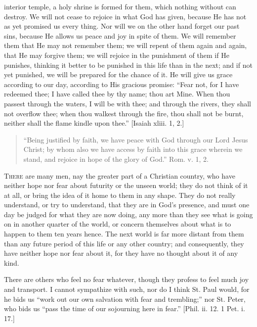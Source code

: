 interior temple, a holy shrine is formed for them, which nothing
without can destroy. We will not cease to rejoice in what God has
given, because He has not as yet promised us every thing. Nor will we
on the other hand forget our past sins, because He allows us peace and
joy in spite of them. We will remember them that He may not remember
them; we will repent of them again and again, that He may forgive
them; we will rejoice in the punishment of them if He punishes,
thinking it better to be punished in this life than in the next; and
if not yet punished, we will be prepared for the chance of it. He will
give us grace according to our day, according to His gracious promise:
``Fear not, for I have redeemed thee; I have called thee by thy
name; thou art Mine. When thou passest through the waters, I will be
with thee; and through the rivers, they shall not overflow thee; when
thou walkest through the fire, thou shall not be burnt, neither shall
the flame kindle upon thee.'' [Isaiah xliii. 1, 2.]


\begin{quote}

``Being justified by faith, we have peace with God through
our Lord Jesus Christ; by whom also we have access by faith into
this grace wherein we stand, and rejoice in hope of the glory of
God.'' Rom. v. 1, 2.

\end{quote}

T\textsc{here} are many men, nay the greater part of a Christian country,
who have neither hope nor fear about futurity or the unseen world;
they do not think of it at all, or bring the idea of it home to them
in any shape. They do not really understand, or try to understand,
that they are in God's presence, and must one day be judged for what
they are now doing, any more than they see what is going on in another
quarter of the world, or concern themselves about what is to happen to
them ten years hence. The next world is far more distant from them
than any future period of this life or any other country; and
consequently, they have neither hope nor fear about it, for they have
no thought about it of any kind.

There are others who feel no fear whatever, though they profess to
feel much joy and transport. I cannot sympathize with such, nor do I
think St. Paul would, for he bids us ``work out our own salvation
with fear and trembling;'' nor St. Peter, who bids us ``pass
the time of our sojourning here in fear.'' [Phil. ii. 12. 1 Pet. i.
17.]

